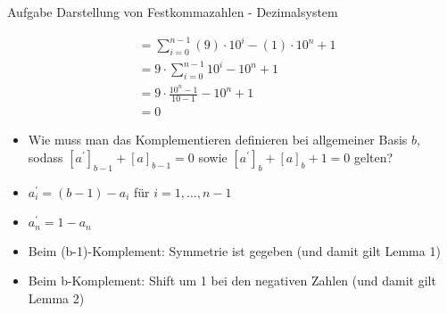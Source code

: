 \begin{frame}[allowframebreaks]{Aufgabe \thesection}{Darstellung von Festkommazahlen - Dezimalsystem}
\begin{solution}
\begin{itemize}
\begin{align*}
            &=\sum_{i=0}^{n-1}(9)\cdot10^{i}-(1)\cdot10^{n}+1\\
            &=9\cdot\sum_{i=0}^{n-1}10^{i}-10^{n}+1\\
            &=9\cdot\frac{10^{n}-1}{10-1}-10^{n}+1\\
            &=0
        \end{align*}
    \end{itemize}
  \end{solution}
  \begin{exercisenoinc} %
    \begin{itemize}
        \item Wie muss man das Komplementieren definieren bei allgemeiner Basis $b$, sodass $[a^{\prime}]_{b-1}+[a]_{b-1} = 0$ sowie $[a^{\prime}]_{b}+[a]_{b} + 1 = 0$ gelten?
    \end{itemize}
  \end{exercisenoinc}
  \begin{solutionnoinc} %
        \begin{itemize}
            \item $a_i^{\prime} = (b-1) - a_i$ für $i = 1,..., n-1$ 
            \item $a_n^{\prime} = 1 - a_n$ 
            \item Beim (b-1)-Komplement: Symmetrie ist gegeben (und damit gilt Lemma 1) 
            \item Beim b-Komplement: Shift um 1 bei den negativen Zahlen (und damit gilt Lemma 2) 
        \end{itemize}
  \end{solutionnoinc}
\end{frame}
